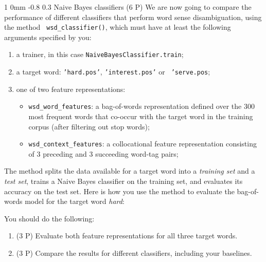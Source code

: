 \documentclass[11pt]{article}
\makeatletter
\newcommand{\newsec}[2]{\section{#1}\label{sec:#2}\noindent}
\renewcommand{\section}{\@startsection
{section}%
{1}%
{0mm}%
{-0.8\baselineskip}%
{0.3\baselineskip}%
{\bfseries\large}}%
\makeatother
\begin{document}
\newsec{Naive Bayes classifiers (6 P)}{naive}%
We are now going to compare the performance of different classifiers
that perform word sense disambiguation, using the method {\tt
  wsd\_classifier()}, which must have at least the following arguments
specified by you:
\begin{enumerate}[topsep=0.2cm,noitemsep]
\item a trainer, in this case {\tt NaiveBayesClassifier.train};
\item a target word: {\tt 'hard.pos'}, {\tt 'interest.pos'} or {\tt
    'serve.pos};
\item one of two feature representations:
\begin{itemize}[noitemsep,topsep=0.1cm]
\item {\tt wsd\_word\_features}: a bag-of-words representation defined
  over the 300 most frequent words that co-occur with the target word
  in the training corpus (after filtering out stop words);
\item {\tt wsd\_context\_features}: a collocational feature
  representation consisting of 3 preceding and 3 succeeding word-tag
  pairs;
\end{itemize}
\end{enumerate}
The method splits the data available for a target word into a {\em
  training set} and a {\em test set}, trains a Naive Bayes classifier
on the training set, and evaluates its accuracy on the test set. Here
is how you use the method to evaluate the bag-of-words model for the
target word \emph{hard}:
\begin{center}
\fbox{
\scalebox{0.8}{

}}
\end{center}
You should do the following:
\begin{enumerate}[noitemsep,topsep=0.2cm]
\item (3 P) Evaluate both feature representations for all three target words.
\item (3 P) Compare the results for different classifiers, including your baselines.
\end{enumerate}
\end{document}
